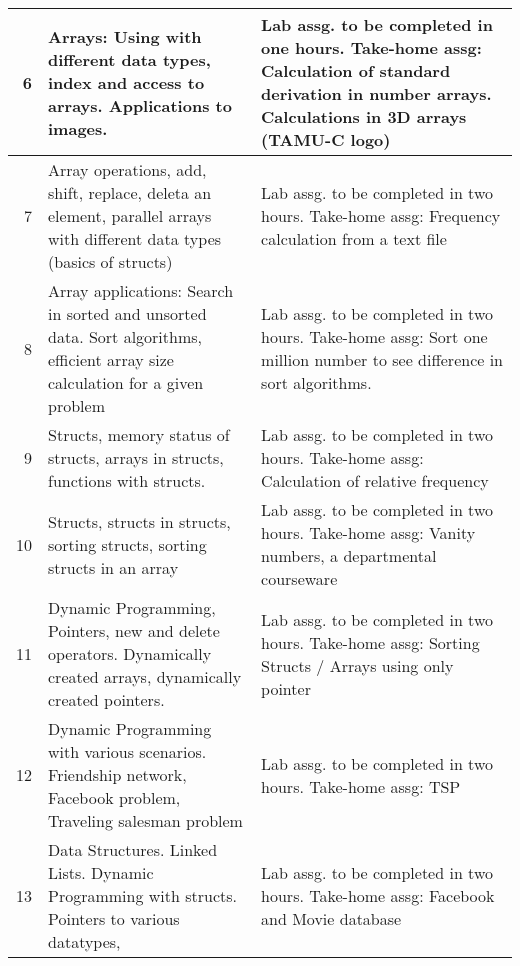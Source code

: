 \documentclass[11pt]{article}
\begin{document}
\begin{center}
\begin{tabular}{rll}
\hline
          6  &  Arrays: Using with different data types, index and access to arrays.  Applications to images.                                         &  Lab assg. to be completed in one hours. Take-home assg: Calculation of standard derivation in number arrays.  Calculations in 3D arrays (TAMU-C logo)  \\
\hline
          7  &  Array operations, add, shift, replace, deleta an element, parallel arrays with different data types (basics of structs)               &  Lab assg. to be completed in two hours. Take-home assg: Frequency calculation from a text file                                                         \\
\hline
          8  &  Array applications: Search in sorted and unsorted data.  Sort algorithms, efficient array size calculation for a given problem        &  Lab assg. to be completed in two hours. Take-home assg: Sort one million number to see difference in sort algorithms.                                  \\
\hline
          9  &  Structs, memory status of structs, arrays in structs, functions with structs.                                                         &  Lab assg. to be completed in two hours. Take-home assg: Calculation of relative frequency                                                              \\
\hline
         10  &  Structs, structs in structs, sorting structs, sorting structs in an array                                                             &  Lab assg. to be completed in two hours. Take-home assg: Vanity numbers, a departmental courseware                                                      \\
\hline
         11  &  Dynamic Programming, Pointers, new and delete operators.  Dynamically created arrays, dynamically created pointers.                   &  Lab assg. to be completed in two hours. Take-home assg: Sorting Structs / Arrays using only pointer                                                    \\
\hline
         12  &  Dynamic Programming with various scenarios.  Friendship network, Facebook problem, Traveling salesman problem                         &  Lab assg. to be completed in two hours. Take-home assg: TSP                                                                                            \\
\hline
         13  &  Data Structures. Linked Lists. Dynamic Programming with structs.  Pointers to various datatypes,                                      &  Lab assg. to be completed in two hours. Take-home assg: Facebook and Movie database                                                                    \\

\end{tabular}
\end{center}
\end{document}
